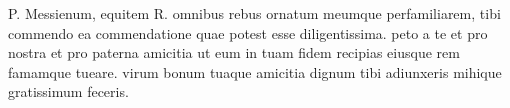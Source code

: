


P. Messienum, equitem R. omnibus rebus ornatum meumque perfamiliarem, tibi commendo ea commendatione quae potest esse diligentissima. peto a te et pro nostra et pro paterna amicitia ut eum in tuam fidem
recipias eiusque rem famamque tueare. virum bonum tuaque amicitia dignum tibi adiunxeris mihique gratissimum feceris.
